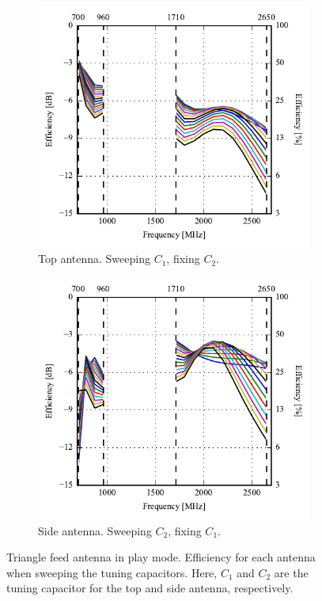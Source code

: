 \begin{figure}[htbp]
    \centering
    \begin{subfigure}{0.49\linewidth}
        \centering
        \includegraphics{img/tech_sol/trianglefeed/play_mode/efficiency-ac1-Csh1.pdf}
        \caption{Top antenna. Sweeping $C_1$, fixing $C_2$.}
    \end{subfigure}
    \hfill
    \begin{subfigure}{0.49\linewidth}
        \centering
        \includegraphics{img/tech_sol/trianglefeed/play_mode/efficiency-ac2-Csh2.pdf}
        \caption{Side antenna. Sweeping $C_2$, fixing $C_1$.}
    \end{subfigure}
    \caption{Triangle feed antenna in play mode. Efficiency for each antenna when sweeping the tuning capacitors. Here, $C_1$ and $C_2$ are the tuning capacitor for the top and side antenna, respectively.}
    \label{fig:eff_sol2play}
\end{figure}

